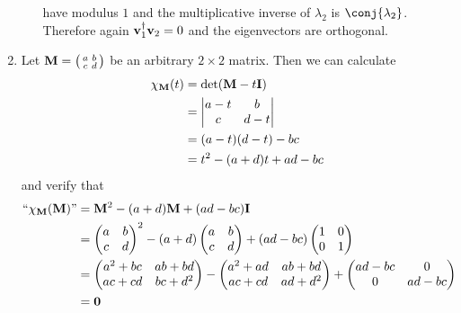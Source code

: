 \documentclass[fleqn,a4paper,11pt]{article}
\begin{document}
\begin{enumerate}[label=\textbf{\arabic*.}]
\begin{enumerate}[label=(\roman*)]
     have modulus \(1\) and the multiplicative inverse of \(\lambda_2\) is
     \(\conj{\lambda_2}\). Therefore again \(\mathrm{\mathbf{v}}_1^\dag \mathrm{\mathbf{v}}_2 = 0\) and
     the eigenvectors are orthogonal.
   \end{enumerate}
  \item
   Let \(\mathbf{M} = \begin{psmallmatrix} a & b \\ c & d \end{psmallmatrix}\) be an
   arbitrary \(2 \times 2\) matrix. Then we can calculate
  \begin{align*}
   \chi_{\mathbf{M}}(t)
   &= \det(\mathbf{M} - t \mathbf{I}) \\
   &=
   \begin{vmatrix}
    a - t & b \\
    c & d - t
   \end{vmatrix} \\
   &= (a - t)(d - t) - bc \\
   &= t^2 - (a + d)t + ad - bc
  \end{align*}
  and verify that
  \begin{align*}
   \text{``\(\chi_{\mathbf{M}}(\mathbf{M})\)''}
   &= \mathbf{M}^2 - (a + d)\mathbf{M} + (ad - bc)\mathbf{I} \\
   &=
   \begin{pmatrix}
    a & b \\
    c & d
   \end{pmatrix}^2
   - (a + d)\begin{pmatrix}
    a & b \\
    c & d
   \end{pmatrix}
   + (ad - bc)\begin{pmatrix}
    1 & 0 \\
    0 & 1
   \end{pmatrix} \\
   &=
   \begin{pmatrix}
    a^2 + bc & ab + bd \\
    ac + cd & bc + d^2
   \end{pmatrix}
   - \begin{pmatrix}
    a^2 + ad & ab + bd \\
    ac + cd & ad + d^2
   \end{pmatrix}
   + \begin{pmatrix}
    ad - bc & 0 \\
    0 & ad - bc
   \end{pmatrix} \\
   &= \mathbf{0}
  \end{align*}

\end{enumerate}
\end{document}
